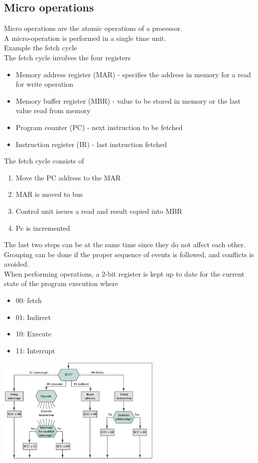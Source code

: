 \documentclass[12pt, a4paper]{article}
\begin{document}
		\subsection{Micro operations}
			Micro operations are the atomic operations of a processor.\\
			A micro-operation is performed in a single time unit.\\
			Example the fetch cycle\\
			The fetch cycle involves the four registers
			\begin{itemize}
				\item Memory address register (MAR) - specifies the address in memory for a read for write operation
				\item Memory buffer register (MBR) - value to be stored in memory or the last value read from memory
				\item Program counter (PC) - next instruction to be fetched
				\item Instruction register (IR) - last instruction fetched
			\end{itemize}
			The fetch cycle consists of
			\begin{enumerate}
				\item Move the PC address to the MAR
				\item MAR is moved to bus 
				\item Control unit issues a read and result copied into MBR 
				\item Pc is incremented
			\end{enumerate}
			The last two steps can be at the same time since they do not affect each other.\\
			Grouping can be done if the proper sequence of events is followed, and conflicts is avoided.\\
			When performing operations, a 2-bit register is kept up to date for the current state of the program execution where
			\begin{itemize}
				\item 00: fetch
				\item 01: Indirect
				\item 10: Execute
				\item 11: Interrupt
			\end{itemize}
			\includegraphics[width=300px]{assets/instructionCycle.png}\\
\end{document}
